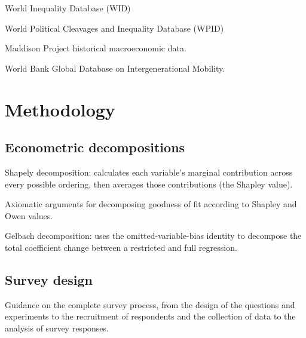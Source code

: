 \documentclass{article}
\newcommand{\citem}[1]{\medskip \noindent \textbf{\cite*{#1}}}
\begin{document}
\citem{wid2026}

World Inequality Database (WID)

\citem{gethin2021wpid}

World Political Cleavages and Inequality Database (WPID)

\citem{bolt2024maddison}

Maddison Project historical macroeconomic data.

\citem{gdim2023}

World Bank Global Database on Intergenerational Mobility.






\section{Methodology}

\subsection{Econometric decompositions}

\citem{shorrocks2013decomposition}

Shapely decomposition: calculates each variable's marginal contribution across every possible ordering, then averages those contributions (the Shapley value).

\citem{huettner2012axiomatic}

Axiomatic arguments for decomposing goodness of fit according to Shapley and Owen values.

\citem{gelbach2016covariates}

Gelbach decomposition: uses the omitted-variable-bias identity to decompose the total coefficient change between a restricted and full regression.

\subsection{Survey design}

\citem{stantcheva2023run}

Guidance on the complete survey process, from the design of the questions and experiments to the recruitment of respondents and the collection of data to the analysis of survey responses.
\end{document}
